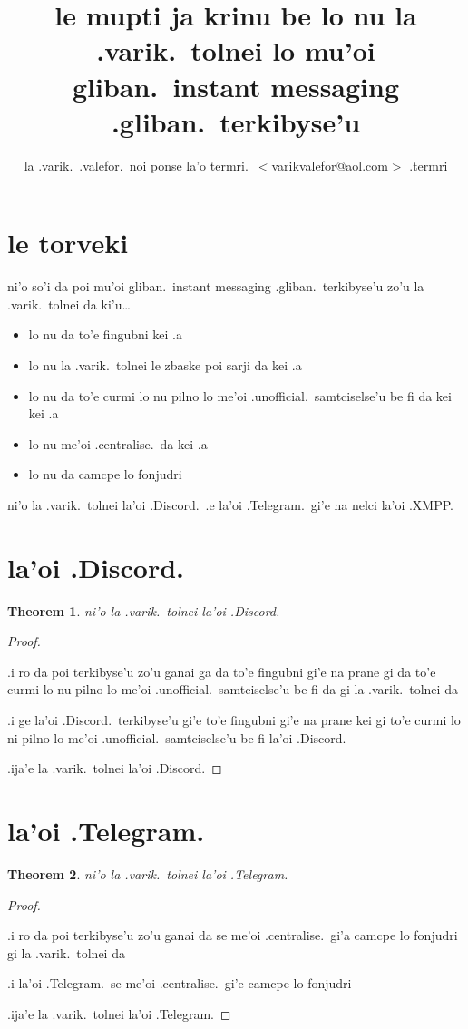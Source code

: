 \documentclass{article}
\title{le mupti ja krinu be lo nu la .varik.\ tolnei lo mu'oi gliban.\ instant messaging .gliban.\ terkibyse'u}
\author{la .varik.\ .valefor.\ noi ponse la'o termri.\ $<$varikvalefor@aol.com$>$ .termri}
\newtheorem{thm}{Theorem}
\begin{document}
\maketitle

\section{le torveki}
ni'o so'i da poi mu'oi gliban.\ instant messaging .gliban.\ terkibyse'u zo'u la .varik.\ tolnei da ki'u\ldots
\begin{itemize}
	\item lo nu da to'e fingubni kei .a
	\item lo nu la .varik.\ tolnei le zbaske poi sarji da kei .a
	\item lo nu da to'e curmi lo nu pilno lo me'oi .unofficial.\ samtciselse'u be fi da kei kei .a
	\item lo nu me'oi .centralise.\ da kei .a
	\item lo nu da camcpe lo fonjudri
\end{itemize}

ni'o la .varik.\ tolnei la'oi .Discord.\ .e la'oi .Telegram.\ gi'e na nelci la'oi .XMPP.
\section{la'oi .Discord.}
\begin{thm}
	ni'o la .varik.\ tolnei la'oi .Discord.
\end{thm}
\begin{proof}
	${}$

	.i ro da poi terkibyse'u zo'u ganai ga da to'e fingubni gi'e na prane gi da to'e curmi lo nu pilno lo me'oi .unofficial.\ samtciselse'u be fi da gi la .varik.\ tolnei da

	.i ge la'oi .Discord.\ terkibyse'u gi'e to'e fingubni gi'e na prane kei gi to'e curmi lo ni pilno lo me'oi .unofficial.\ samtciselse'u be fi la'oi .Discord.

	.ija'e la .varik.\ tolnei la'oi .Discord.
\end{proof}

\section{la'oi .Telegram.}
\begin{thm}
	ni'o la .varik.\ tolnei la'oi .Telegram.
\end{thm}
\begin{proof}
	${}$

	.i ro da poi terkibyse'u zo'u ganai da se me'oi .centralise.\ gi'a camcpe lo fonjudri gi la .varik.\ tolnei da

	.i la'oi .Telegram.\ se me'oi .centralise.\ gi'e camcpe lo fonjudri

	.ija'e la .varik.\ tolnei la'oi .Telegram.
\end{proof}
\end{document}
